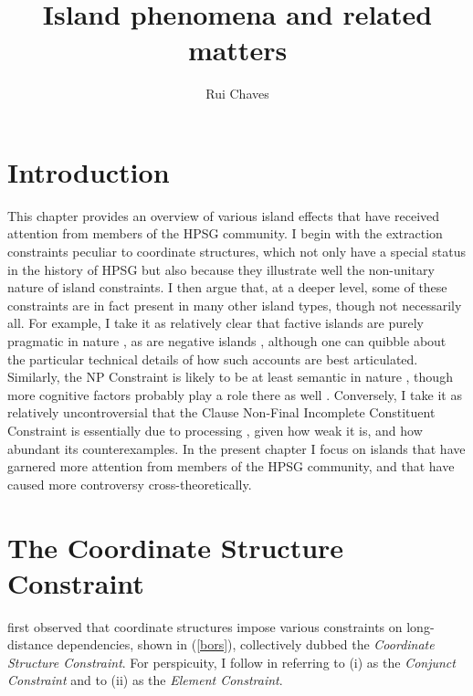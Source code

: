 \documentclass[output=paper]{langsci/langscibook}
\author{Rui Chaves\affiliation{University at Buffalo}}
\title{Island phenomena and related matters}
\begin{document}
\label{chap-islands}






\maketitle
\section{Introduction} 

 This chapter provides an overview of various island effects that have received attention from members of
 the HPSG community. I begin with the extraction constraints peculiar to coordinate structures, which not only have a special status in the history of HPSG but also because they
illustrate well the non-unitary nature of island constraints. I then argue that, at a deeper level, some of these constraints are in fact present in many other island types, though not necessarily all.
For example,
I take it as relatively clear that factive islands  are purely pragmatic in nature \citep{Oshima:2006:FIP:1761528.1761544}, as are negative islands \citep{abrusan,abrusanspec},
although one can quibble about the particular technical details of how such accounts are best articulated. 
Similarly,  the NP Constraint is likely to be at least semantic in nature \citep{kuno87,godard92,dubinsky2009}, though more cognitive factors probably play a role there as well \citep{Dean}. Conversely, I take it as relatively uncontroversial that the Clause Non-Final Incomplete Constituent  Constraint  is essentially due to processing  \citep{lev91,fodor92}, given how weak it is, and how abundant its counterexamples. In the present chapter I focus on islands that have garnered more attention from members of the HPSG community, and that have caused more 
 controversy cross-theoretically.

\section{The Coordinate Structure Constraint}

\cite{Ross67} first observed that coordinate structures
impose various constraints on long-distance dependencies, shown in  (\ref{bors}), collectively dubbed the
\emph{Coordinate Structure Constraint}. For perspicuity,  I  follow \citet{grosu73} in referring to (i) as the \emph{Conjunct Constraint} and to (ii) as the \emph{Element Constraint}.
\end{document}
